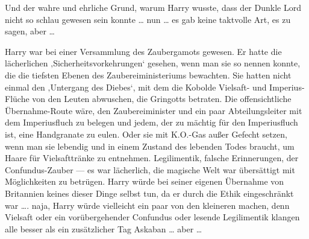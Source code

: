Und der wahre und ehrliche Grund, warum Harry wusste, dass der Dunkle Lord nicht so schlau gewesen sein konnte … nun … es gab keine taktvolle Art, es zu sagen, aber …

Harry war bei einer Versammlung des Zaubergamots gewesen. Er hatte die lächerlichen ‚Sicherheitsvorkehrungen‘ gesehen, wenn man sie so nennen konnte, die die tiefsten Ebenen des Zaubereiministeriums bewachten. Sie hatten nicht einmal den ‚Untergang des Diebes‘, mit dem die Kobolde Vielsaft- und Imperius-Flüche von den Leuten abwuschen, die Gringotts betraten. Die offensichtliche Übernahme-Route wäre, den Zaubereiminister und ein paar Abteilungsleiter mit dem Imperiusfluch zu belegen und jedem, der zu mächtig für den Imperiusfluch ist, eine Handgranate zu eulen. Oder sie mit K.O.-Gas außer Gefecht setzen, wenn man sie lebendig und in einem Zustand des lebenden Todes braucht, um Haare für Vielsafttränke zu entnehmen. Legilimentik, falsche Erinnerungen, der Confundus-Zauber — es war lächerlich, die magische Welt war übersättigt mit Möglichkeiten zu betrügen. Harry würde bei seiner eigenen Übernahme von Britannien keines dieser Dinge selbst tun, da er durch die Ethik eingeschränkt war …. naja, Harry würde vielleicht ein paar von den kleineren machen, denn Vielsaft oder ein vorübergehender Confundus oder lesende Legilimentik klangen alle besser als ein zusätzlicher Tag Askaban … aber …

